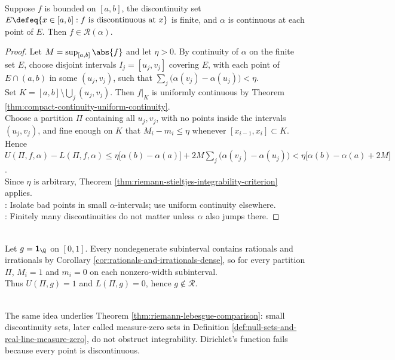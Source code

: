 \begin{theorem} \label{thm:finitely-many-discontinuities-integrable} \\
Suppose $f$ is bounded on $[a,b]$, the discontinuity set $E\defeq\{x\in[a,b]:f\text{ is discontinuous at }x\}$ is finite, and $\alpha$ is continuous at each point of $E$. Then $f\in\mathcal{R}(\alpha)$.
\begin{proof}
Let $M=\sup_{[a,b]}\abs{f}$ and let $\eta>0$. By continuity of $\alpha$ on the finite set $E$, choose disjoint intervals $I_j=[u_j,v_j]$ covering $E$, with each point of $E\cap(a,b)$ in some $(u_j,v_j)$, such that $\sum\limits_j\bigl(\alpha(v_j)-\alpha(u_j)\bigr)<\eta$.\\
Set $K=[a,b]\setminus\bigcup_j(u_j,v_j)$. Then $f|_K$ is uniformly continuous by Theorem \ref{thm:compact-continuity-uniform-continuity}.\\
Choose a partition $\Pi$ containing all $u_j,v_j$, with no points inside the intervals $(u_j,v_j)$, and fine enough on $K$ that $M_i-m_i\leq\eta$ whenever $[x_{i-1},x_i]\subset K$.\\
Hence $U(\Pi,f,\alpha)-L(\Pi,f,\alpha) \leq \eta\bigl[\alpha(b)-\alpha(a)\bigr] +2M\sum\limits_j\bigl(\alpha(v_j)-\alpha(u_j)\bigr) <\eta\bigl[\alpha(b)-\alpha(a)+2M\bigr]$.\\
Since $\eta$ is arbitrary, Theorem \ref{thm:riemann-stieltjes-integrability-criterion} applies.\\
: Isolate bad points in small $\alpha$-intervals; use uniform continuity elsewhere.\\
: Finitely many discontinuities do not matter unless $\alpha$ also jumps there.
\end{proof}
\end{theorem}

\begin{example} \label{ex:dirichlet-function-not-riemann-integrable} \\
Let $g=\mathbf{1}_{\Q}$ on $[0,1]$. Every nondegenerate subinterval contains rationals and irrationals by Corollary \ref{cor:rationals-and-irrationals-dense}, so for every partition $\Pi$, $M_i=1$ and $m_i=0$ on each nonzero-width subinterval.\\
Thus $U(\Pi,g)=1$ and $L(\Pi,g)=0$, hence $g\notin\mathcal{R}$.
\end{example}

\begin{remark} \label{rem:small-discontinuity-sets-riemann-preview} \\
The same idea underlies Theorem \ref{thm:riemann-lebesgue-comparison}: small discontinuity sets, later called measure-zero sets in Definition \ref{def:null-sets-and-real-line-measure-zero}, do not obstruct integrability. Dirichlet's function fails because every point is discontinuous.
\end{remark}

